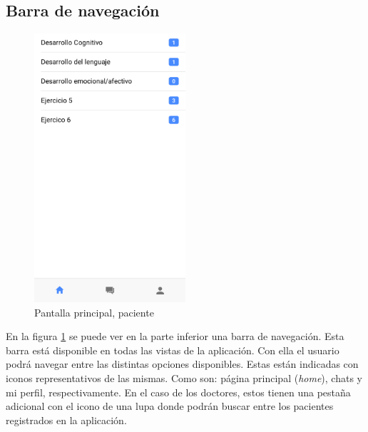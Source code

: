 \subsection{Barra de navegación}
\begin{figure}[!h]
    \centering
    \includegraphics[width=0.5\textwidth]{images/screenshots/Paciente-ventana-principal.png}
    \caption{Pantalla principal, paciente}
    \label{pantalla-principal-paciente}
\end{figure}

En la figura \ref{pantalla-principal-paciente} se puede ver en la parte
inferior una barra de navegación. Esta barra está disponible en todas las
vistas de la aplicación. Con ella el usuario podrá navegar entre las
distintas opciones disponibles. Estas están indicadas con iconos
representativos de las mismas. Como son: página principal (\textit{home}),
chats y mi perfil, respectivamente. En el caso de los doctores, estos tienen
una pestaña adicional con el icono de una lupa donde podrán buscar entre los
pacientes registrados en la aplicación.
\clearpage

